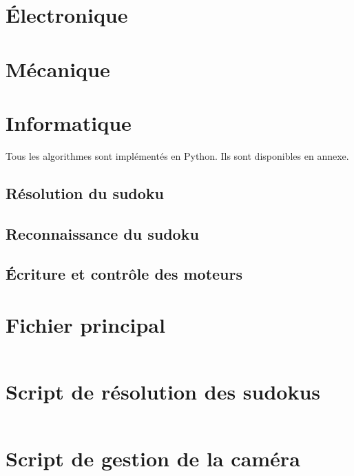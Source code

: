 \documentclass[12pt,a4paper]{report}
\newenvironment{changemargin}[2]{\begin{list}{}{%
\setlength{\topsep}{0pt}%
\setlength{\leftmargin}{0pt}%
\setlength{\rightmargin}{0pt}%
\setlength{\listparindent}{\parindent}%
\setlength{\itemindent}{\parindent}%
\setlength{\parsep}{0pt plus 1pt}%
\addtolength{\leftmargin}{#1}%
\addtolength{\rightmargin}{#2}%
}\item }{\end{list}}
\begin{document}
	\chapter{Électronique}
	\chapter{Mécanique}
	\chapter{Informatique}
	Tous les algorithmes sont implémentés en Python. Ils sont disponibles en annexe.
	\section{Résolution du sudoku}
	\section{Reconnaissance du sudoku}
	\section{Écriture et contrôle des moteurs}
	

\printbibliography
\nocite{*}
\appendix
\begin{changemargin}{-2cm}{-4cm}
\chapter{Fichier principal}
\label{main}
\inputminted[fontsize=\scriptsize, linenos=true]{Python}{../script/main.py}
\chapter{Script de résolution des sudokus}
\label{resolution}
\inputminted[fontsize=\scriptsize, linenos=true]{Python}{../script/resolution.py}
\chapter{Script de gestion de la caméra}
\label{camera}
\inputminted[fontsize=\scriptsize, linenos=true]{Python}{../script/camera.py}


\end{changemargin}
\end{document}
